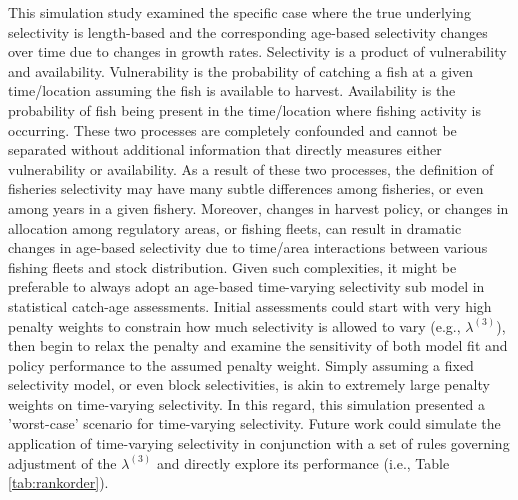 \documentclass[review,letterpaper,10pt,authoryear]{elsarticle}
\begin{document}
This simulation study examined the specific case where the true underlying selectivity is length-based and the corresponding age-based selectivity changes over time due to changes in growth rates.  Selectivity is a product of vulnerability and availability.  Vulnerability is the probability of catching a fish at a given time/location assuming the fish is available to harvest.  Availability is the probability of fish being present in the time/location where fishing activity is occurring.  These two processes are completely confounded and cannot be separated without additional information that directly measures either vulnerability or availability.  As a result of these two processes, the definition of fisheries selectivity may have many subtle differences among fisheries, or even among years in a given fishery.  Moreover, changes in harvest policy, or changes in allocation among regulatory areas, or fishing fleets, can result in dramatic changes in age-based selectivity due to time/area interactions between various fishing fleets and stock distribution.  Given such complexities, it might be preferable to always adopt an age-based time-varying selectivity sub model in statistical catch-age assessments. Initial assessments could start with very high penalty weights to constrain how much selectivity is allowed to vary (e.g., $\lambda^{(3)}$), then begin to relax the penalty and examine the sensitivity of both model fit and policy performance to the assumed penalty weight.  Simply assuming a fixed selectivity model, or even block selectivities, is akin to extremely large penalty weights on time-varying selectivity.  In this regard, this simulation presented a 'worst-case' scenario for time-varying selectivity.  Future work could simulate the application of time-varying selectivity in conjunction with a set of rules governing adjustment of the $\lambda^{(3)}$  and directly explore its performance (i.e., Table \ref{tab:rankorder}).
\end{document}
